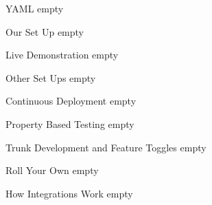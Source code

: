 \documentclass{beamer}
\begin{document}
\begin{frame}{YAML}
	empty
\end{frame}

\begin{frame}{Our Set Up}
	empty
\end{frame}

\begin{frame}{Live Demonstration}
	empty
\end{frame}

\begin{frame}{Other Set Ups}
	empty
\end{frame}

\begin{frame}{Continuous Deployment}
	empty
\end{frame}

\begin{frame}{Property Based Testing}
	empty
\end{frame}

\begin{frame}{Trunk Development and Feature Toggles}
	empty
\end{frame}

\begin{frame}{Roll Your Own}
	empty
\end{frame}

\begin{frame}{How Integrations Work}
	empty
\end{frame}
\end{document}
